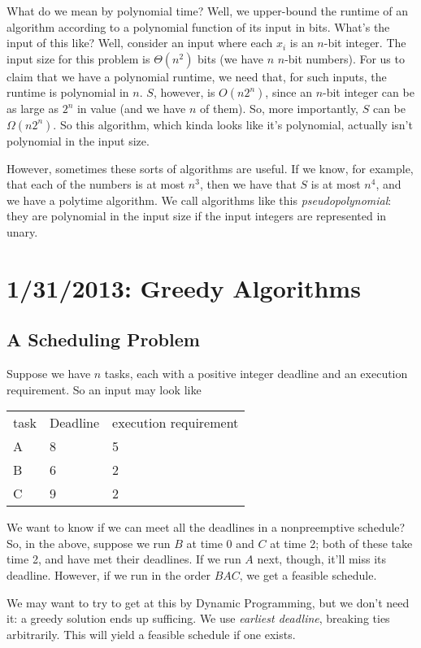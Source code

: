 \documentclass{article}
\begin{document}
What do we mean by polynomial time?
Well, we upper-bound the runtime of an algorithm according to a polynomial
function of its input in bits.
What's the input of this like?
Well, consider an input where each $x_i$ is an $n$-bit integer.
The input size for this problem is $\Theta(n^2)$ bits (we have $n$ $n$-bit numbers).
For us to claim that we have a polynomial runtime, we need that, for such
inputs, the runtime is polynomial in $n$.
$S$, however, is $O(n 2^n)$, since an $n$-bit integer can be as large
as $2^n$ in value (and we have $n$ of them).
So, more importantly, $S$ can be $\Omega(n 2^n)$.
So this algorithm, which kinda looks like it's polynomial, actually
isn't polynomial in the input size.

However, sometimes these sorts of algorithms are useful.
If we know, for example, that each of the numbers is at most $n^3$, then we have
that $S$ is at most $n^4$, and we have a polytime algorithm.
We call algorithms like this \emph{pseudopolynomial}: they are
polynomial in the input size if the input integers are represented
in unary.


\section{1/31/2013: Greedy Algorithms}

\subsection{A Scheduling Problem}

Suppose we have $n$ tasks, each with a positive integer deadline and an
execution requirement.
So an input may look like

\begin{tabular}{| lll |}
\hline
task & Deadline & execution requirement \\
A & 8 & 5 \\
B & 6 & 2 \\
C & 9 & 2 \\\hline
\end{tabular}

We want to know if we can meet all the deadlines in a nonpreemptive schedule?
So, in the above, suppose we run $B$ at time 0 and $C$ at time 2; both
of these take time 2, and have met their deadlines. 
If we run $A$ next, though, it'll miss its deadline.
However, if we run in the order $BAC$, we get a feasible schedule.

We may want to try to get at this by Dynamic Programming, but we don't
need it: a greedy solution ends up sufficing.
We use \emph{earliest deadline}, breaking ties arbitrarily.
This will yield a feasible schedule if one exists.
\end{document}
